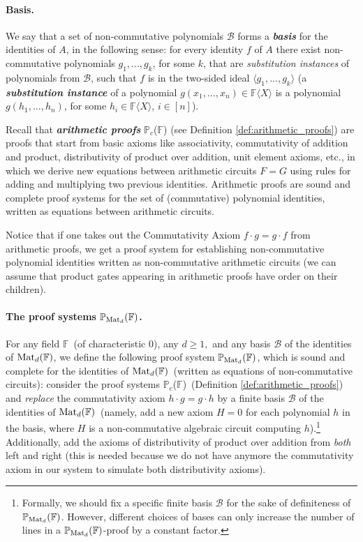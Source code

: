 \documentclass[12pt,reqno]{article}
\newcommand\F{\ensuremath{\mathbb F}}
\newcommand\PP{{\mathbb P}}
\newcommand\PC{\ensuremath{\PP_c}}
\newcommand\PMd{\ensuremath{\PP_{{\rm Mat}_d}(\F)}}
\newcommand{\cd}{\cdot}
\newcommand {\para}[1] {\paragraph{#1}}
\newcommand{\matd}{{\ensuremath{{\rm Mat}_d(\F)}}}
\newcommand{\freea}{\ensuremath{\F\langle X\rangle}}
\begin{document}
\para{Basis.}We say that a set of non-commutative polynomials $\mathcal B$ forms a \emph{\textbf{basis}} for the identities of $A$, in the following sense: for every identity $f$ of $A$ there exist non-commutative polynomials $g_1,...,g_k$, for some $k$, that are \textit{substitution instances} of polynomials from $\mathcal B$, such that  $f$ is in the two-sided ideal $\langle g_1,...,g_k \rangle$ (a \textit{\textbf{substitution instance} }of a polynomial $g(x_1,\ldots, x_n)\in\freea $ is a polynomial $g(h_1,\ldots,h_n)$, for some $h_i\in\freea$, $i\in[n]$).
\medskip

Recall that \textbf{\textit{arithmetic proofs}} \PC(\F) (see Definition \ref{def:arithmetic_proofs}) are proofs that start from basic axioms like associativity, commutativity of addition and product, distributivity of product over addition, unit element axioms, etc., in which  we derive new equations between arithmetic circuits $F=G$ using rules for adding and multiplying two previous identities. Arithmetic proofs are sound and complete proof systems for the set of (commutative) polynomial identities, written as equations between arithmetic circuits.

Notice that if one takes out the Commutativity Axiom $f\cd g = g\cd f$ from arithmetic proofs, we get a proof system for establishing non-commutative polynomial identities written as non-commutative arithmetic circuits (we can assume that product gates appearing in arithmetic proofs have order on their children).

\para{The proof systems \PMd.}
For any field \F\ (of characteristic 0), any $d\ge 1,$ and any basis \(\mathcal B\) of the identities of \matd, we define the following proof system \PMd, which is sound and complete for the identities of \matd\ (written as equations of non-commutative circuits): consider the proof systems  \PC(\F)\ (Definition \ref{def:arithmetic_proofs}) and \textit{replace }the commutativity axiom \(h\cd g=g\cd h\) by  a finite basis \(\mathcal B\) of the identities of  \matd\  (namely, add a new axiom $H=0$ for each polynomial $h$ in the basis, where $H$ is a non-commutative algebraic circuit computing $h$).\footnote{Formally, we should fix a specific finite basis \(\mathcal B\) for the sake of definiteness of \PMd. However, different choices of bases can only increase the number of lines in a \PMd-proof by a constant factor.} Additionally, add the axioms of  distributivity of product over addition from \textit{both} left and right (this is needed because we do not have anymore the commutativity axiom in our system to simulate both distributivity axioms).
\end{document}
